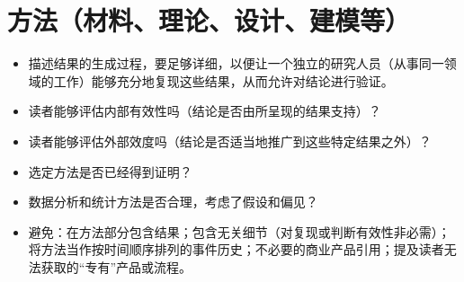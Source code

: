\section*{方法（材料、理论、设计、建模等）}
\begin{itemize}
\item 描述结果的生成过程，要足够详细，以便让一个独立的研究人员（从事同一领域的工作）能够充分地复现这些结果，从而允许对结论进行验证。
\item 读者能够评估内部有效性吗（结论是否由所呈现的结果支持）？
\item 读者能够评估外部效度吗（结论是否适当地推广到这些特定结果之外）？
\item 选定方法是否已经得到证明？
\item 数据分析和统计方法是否合理，考虑了假设和偏见？
\item 避免：在方法部分包含结果；包含无关细节（对复现或判断有效性非必需）；将方法当作按时间顺序排列的事件历史；不必要的商业产品引用；提及读者无法获取的“专有”产品或流程。
\end{itemize}

